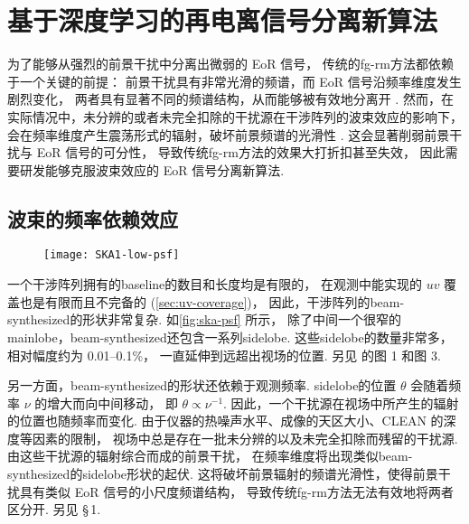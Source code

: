 
\chapter{基于深度学习的再电离信号分离新算法}
\label{chap:cdae}

为了能够从强烈的前景干扰中分离出微弱的 EoR 信号，
传统的\ac{fg-rm}方法都依赖于一个关键的前提：
前景干扰具有非常光滑的频谱，而 EoR 信号沿频率维度发生剧烈变化，
两者具有显著不同的频谱结构，从而能够被有效地分离开 \cite{morales2010,chapman2016}.
然而，在实际情况中，未分辨的或者未完全扣除的干扰源在干涉阵列的波束效应的影响下，
会在频率维度产生震荡形式的辐射，破坏前景频谱的光滑性 \cite{liu2009ps}.
这会显著削弱前景干扰与 EoR 信号的可分性，
导致传统\ac{fg-rm}方法的效果大打折扣甚至失效，
因此需要研发能够克服波束效应的 EoR 信号分离新算法.


\section{波束的频率依赖效应}
\label{sec:beam-effect}

\begin{figure}[htp]
  \centering
  \texttt{[image: SKA1-low-psf]}
  \label{fig:ska-psf}
\end{figure}

一个干涉阵列拥有的\ac{baseline}的数目和长度均是有限的，
在观测中能实现的 $uv$ 覆盖也是有限而且不完备的 (\autoref{sec:uv-coverage})，
因此，干涉阵列的\ac{beam-synthesized}的形状非常复杂.
如\autoref{fig:ska-psf} 所示，
除了中间一个很窄的\ac{mainlobe}，\ac{beam-synthesized}还包含一系列\ac{sidelobe}.
这些\ac{sidelobe}的数量非常多，相对幅度约为 \numrange{0.01}{0.1}\%，
一直延伸到远超出视场的位置.
另见  的图 1 和图 3.

另一方面，\ac{beam-synthesized}的形状还依赖于观测频率.
\ac{sidelobe}的位置 $\theta$ 会随着频率 $\nu$ 的增大而向中间移动，
即 $\theta \propto \nu^{-1}$.
因此，一个干扰源在视场中所产生的辐射的位置也随频率而变化.
由于仪器的热噪声水平、成像的天区大小、CLEAN 的深度等因素的限制，
视场中总是存在一批未分辨的以及未完全扣除而残留的干扰源.
由这些干扰源的辐射综合而成的前景干扰，
在频率维度将出现类似\ac{beam-synthesized}的\ac{sidelobe}形状的起伏.
这将破坏前景辐射的频谱光滑性，使得前景干扰具有类似 EoR 信号的小尺度频谱结构，
导致传统\ac{fg-rm}方法无法有效地将两者区分开.
另见  \S\,1.


